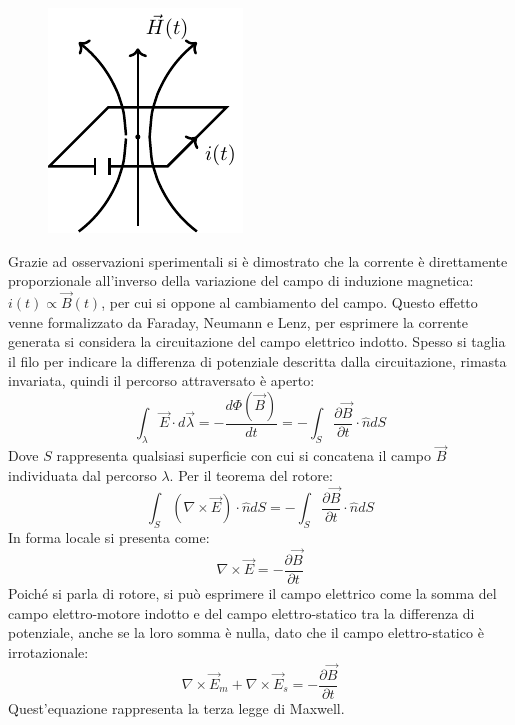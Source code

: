 \documentclass{article}
\numberwithin{equation}{subsection}
\begin{document}
\begin{figure}[H]%
    \centering
    \includegraphics{terza-legge-maxwell.pdf}
    \label{fig:terza-legge-maxwell}
\end{figure}

Grazie ad osservazioni sperimentali si è dimostrato che la corrente è direttamente proporzionale all'inverso della variazione del campo di induzione magnetica: 
$i(t)\propto\vec{B}(t)$, per cui si oppone al cambiamento del campo. Questo effetto venne formalizzato da Faraday, Neumann e Lenz, per esprimere la corrente generata 
si considera la circuitazione del campo elettrico indotto. Spesso si taglia il filo per indicare la differenza di potenziale descritta dalla circuitazione, rimasta invariata, 
quindi il percorso attraversato è aperto: 
\begin{equation*}
    \displaystyle\int_{\lambda}\vec{E}\cdot d\vec{\lambda}=-\frac{d\Phi(\vec{B})}{dt}=-\int_S\frac{\partial \vec{B}}{\partial t}\cdot\hat{n}dS
\end{equation*}
Dove $S$ rappresenta qualsiasi superficie con cui si concatena il campo $\vec{B}$ individuata dal percorso $\lambda$. Per il teorema del rotore:
\begin{equation}
    \displaystyle\int_S(\nabla\times\vec{E})\cdot\hat{n}dS=-\int_S\frac{\partial \vec{B}}{\partial t}\cdot\hat{n}dS
\end{equation}
In forma locale si presenta come:
\begin{equation*}
    \nabla\times\vec{E}=\displaystyle-\frac{\partial \vec{B}}{\partial t}
\end{equation*}
Poiché si parla di rotore, si può esprimere il campo elettrico come la somma del campo elettro-motore indotto e del campo elettro-statico tra la differenza di potenziale, 
anche se la loro somma è nulla, dato che il campo elettro-statico è irrotazionale:
\begin{equation}
    \nabla\times\vec{E}_m+\nabla\times\vec{E}_s=-\displaystyle\frac{\partial \vec{B}}{\partial t}
\end{equation} 
Quest'equazione rappresenta la terza legge di Maxwell. 
\end{document}

